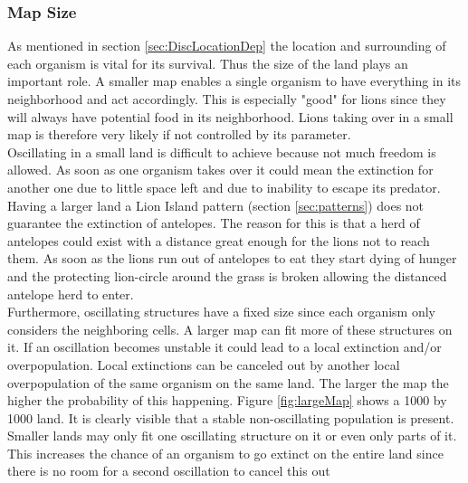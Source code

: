 \documentclass[11pt]{article}
\begin{document}
\subsubsection{Map Size}
\label{sec:DiscMapSize}
As mentioned in section \ref{sec:DiscLocationDep} the location and surrounding of each organism is vital for its survival. Thus the size of the land plays an important role. A smaller map enables a single organism to have everything in its neighborhood and act accordingly. This is especially "good" for lions since they will always have potential food in its neighborhood. Lions taking over in a small map is therefore very likely if not controlled by its parameter.\\
Oscillating in a small land is difficult to achieve because not much freedom is allowed. As soon as one organism takes over it could mean the extinction for another one due to little space left and due to inability to escape its predator.\\
Having a larger land a Lion Island pattern (section \ref{sec:patterns}) does not guarantee the extinction of antelopes. The reason for this is that a herd of antelopes could exist with a distance great enough for the lions not to reach them. As soon as the lions run out of antelopes to eat they start dying of hunger and the protecting lion-circle around the grass is broken allowing the distanced antelope herd to enter.\\
Furthermore, oscillating structures have a fixed size since each organism only considers the neighboring cells. A larger map can fit more of these structures on it. If an oscillation becomes unstable it could lead to a local extinction and/or overpopulation. Local extinctions can be canceled out by another local overpopulation of the same organism on the same land. The larger the map the higher the probability of this happening.  Figure \ref{fig:largeMap} shows a 1000 by 1000 land. It is clearly visible that a stable non-oscillating population is present. Smaller lands may only fit one oscillating structure on it or even only parts of it. This increases the chance of an organism to go extinct on the entire land since there is no room for a second oscillation to cancel this out\\
\end{document}
